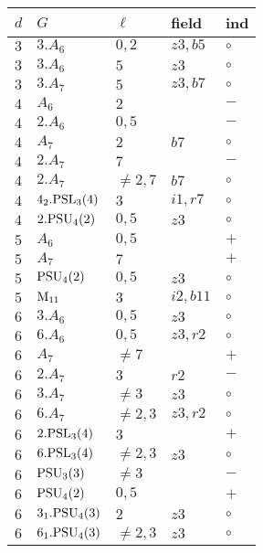 \documentclass[a4paper, 11pt]{article}
\begin{document}
	\begin{longtable}{lllll} \hline
		$d$ & $G$ & $\ell$ & field & ind \\ \hline \hline
		$3$ & $3.A_{6}$ & $0,2$ & $z3, b5$ & $\circ$ \\ \hline
		$3$ & $3.A_{6}$ & $5$ & $z3$ & $\circ$ \\ \hline
		$3$ & $3.A_{7}$ & $5$ & $z3, b7$ & $\circ$ \\ \hline
		$4$ & $A_{6}$ & $2$ & & $-$ \\ \hline
		$4$ & $2.A_{6}$ & $0,5$ & & $-$ \\ \hline
		$4$ & $A_{7}$ & $2$ & $b7$ & $\circ$ \\ \hline
		$4$ & $2.A_{7}$ & $7$ & & $-$ \\ \hline
		$4$ & $2.A_{7}$ & $\neq 2,7$ & $b7$ & $\circ$ \\ \hline
		$4$ & $4_2.{\rm PSL}_{3}(4)$ & $3$ & $i1, r7$ & $\circ$ \\ \hline
		$4$ & $2.{\rm PSU}_{4}(2)$ & $0,5$ & $z3$ & $\circ$ \\ \hline
		$5$ & $A_{6}$ & $0,5$ & & $+$ \\ \hline
		$5$ & $A_{7}$ & $7$ & & $+$ \\ \hline
		$5$ & ${\rm PSU}_{4}(2)$ & $0,5$ & $z3$ & $\circ$ \\ \hline
		$5$ & ${\rm M}_{11}$ & $3$ & $i2, b11$ & $\circ$ \\ \hline
		$6$ & $3.A_{6}$ & $0,5$ & $z3$ & $\circ$ \\ \hline
		$6$ & $6.A_{6}$ & $0,5$ & $z3, r2$ & $\circ$ \\ \hline
		$6$ & $A_{7}$ & $\neq 7$ & & $+$ \\ \hline
		$6$ & $2.A_{7}$ & $3$ & $r2$ & $-$ \\ \hline
		$6$ & $3.A_{7}$ & $\neq 3$ & $z3$ & $\circ$ \\ \hline
		$6$ & $6.A_{7}$ & $\neq 2,3$ & $z3, r2$ & $\circ$ \\ \hline
		$6$ & $2.{\rm PSL}_{3}(4)$ & $3$ & & $+$ \\ \hline
		$6$ & $6.{\rm PSL}_{3}(4)$ & $\neq 2,3$ & $z3$ & $\circ$ \\ \hline
		$6$ & ${\rm PSU}_{3}(3)$ & $\neq 3$ & & $-$ \\ \hline
		$6$ & ${\rm PSU}_{4}(2)$ & $0,5$ & & $+$ \\ \hline
		$6$ & $3_1.{\rm PSU}_{4}(3)$ & $2$ & $z3$ & $\circ$ \\ \hline
		$6$ & $6_1.{\rm PSU}_{4}(3)$ & $\neq 2,3$ & $z3$ & $\circ$ \\ \hline

\end{longtable}
\end{document}
